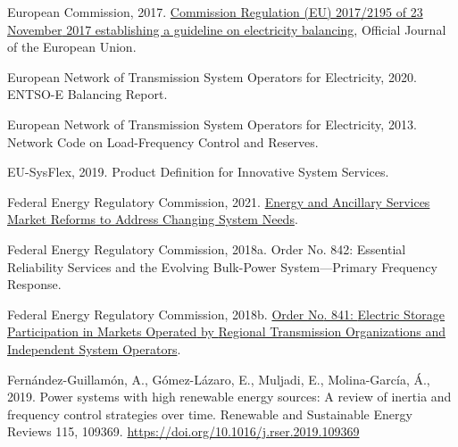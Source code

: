 \documentclass[12pt,a4paper,]{report}
\newlength{\cslhangindent}
\newenvironment{CSLReferences}[2] %
 {%
  \setlength{\parindent}{0pt}
  \ifodd #1 \everypar{\setlength{\hangindent}{\cslhangindent}}\ignorespaces\fi
  \ifnum #2 > 0
  \setlength{\parskip}{#2\baselineskip}
  \fi
 }%
 {}
\begin{document}
\begin{CSLReferences}{1}{0}
\leavevmode{}%
European Commission, 2017.
\href{https://eur-lex.europa.eu/legal-content/EN/TXT/?uri=uriserv:OJ.L_.2017.312.01.0006.01.ENG&toc=OJ:L:2017:312:TOC\#d1e4442-6-1}{Commission
{Regulation} ({EU}) 2017/2195 of 23 {November} 2017 establishing a
guideline on electricity balancing}, Official Journal of the European
Union.

\leavevmode{}%
European Network of Transmission System Operators for Electricity, 2020.
{ENTSO-E Balancing Report}.

\leavevmode{}%
European Network of Transmission System Operators for Electricity, 2013.
Network {Code} on {Load-Frequency Control} and {Reserves}.

\leavevmode{}%
EU-SysFlex, 2019. Product {Definition} for {Innovative System Services}.

\leavevmode{}%
Federal Energy Regulatory Commission, 2021.
\href{https://www.ferc.gov/news-events/news/ferc-staff-issues-report-energy-and-ancillary-services-market-reforms-address}{Energy
and {Ancillary Services Market Reforms} to {Address Changing System
Needs}}.

\leavevmode{}%
Federal Energy Regulatory Commission, 2018a. Order {No}. 842: {Essential
Reliability Services} and the {Evolving Bulk-Power System}---{Primary
Frequency Response}.

\leavevmode{}%
Federal Energy Regulatory Commission, 2018b.
\href{https://www.ferc.gov/media/order-no-841}{Order {No}. 841:
{Electric Storage Participation} in {Markets Operated} by {Regional
Transmission Organizations} and {Independent System Operators}}.

\leavevmode{}%
Fernández-Guillamón, A., Gómez-Lázaro, E., Muljadi, E., Molina-García,
Á., 2019. Power systems with high renewable energy sources: {A} review
of inertia and frequency control strategies over time. Renewable and
Sustainable Energy Reviews 115, 109369.
\url{https://doi.org/10.1016/j.rser.2019.109369}


\end{CSLReferences}
\end{document}
